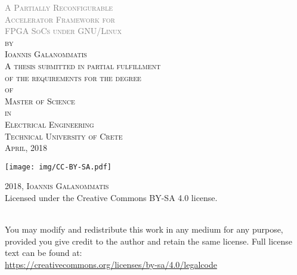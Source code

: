 \thispagestyle{empty}
\begin{center}
	\textsc{
	\textcolor{gray} {\huge
		A Partially Reconfigurable\\
		Accelerator Framework for\\ 
		FPGA SoCs under GNU/Linux\\
	}
	\vspace{50pt}
	by\\
	\vspace{20pt}
	\large Ioannis Galanommatis\\
	\vspace{80pt}
		A thesis submitted in partial fulfillment\\
		of the requirements for the degree\\
		\vspace{12pt}
		of\\
		\vspace{12pt}
		{\large Master of Science\\}
		\vspace{12pt}
		in\\
		\vspace{12pt}
		{\large Electrical Engineering\\}
	}
	\vspace*{\fill}
	\textsc{\large Technical University of Crete\\April, 2018\\}
	
\end{center}

\newpage

\thispagestyle{empty}
\vspace*{\fill}
\noindent
\begin{minipage}{0.2\textwidth}
\noindent \texttt{[image: img/CC-BY-SA.pdf]}
\end{minipage}\hfill
\begin{minipage}{0.8\textwidth}
{\scshape 2018, Ioannis Galanommatis\\}
\rmfamily\textup{Licensed under the Creative Commons BY-SA 4.0 license.}
\end{minipage}
\medskip\\
You may modify and redistribute this work in any medium for any purpose,
provided you give credit to the author and retain the same license.
Full license text can be found at: \\
\url{https://creativecommons.org/licenses/by-sa/4.0/legalcode}
\vspace*{\fill}
